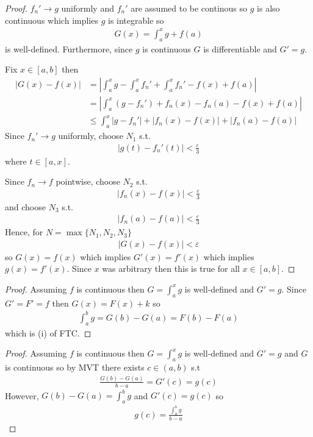 \begin{proof}
    $f_n'\rightarrow g$ uniformly and $f_n'$ are assumed to be 
    continous so $g$ is also continuous which implies $g$ is 
    integrable so 
    \begin{align*}
        G(x) = \int_a^x g + f(a)
    \end{align*}
    is well-defined.
    Furthermore, since $g$ is continuous $G$ is differentiable 
    and $G'=g$.

    Fix $x\in [a,b]$ then 
    \begin{align*}
        |G(x)-f(x)| &= |\int_a^x g - \int_a^x f_n' + \int_a^x f_n' - f(x) + f(a)| \\
        &= |\int_a^x (g - f_n') + f_n(x) - f_n(a) - f(x) + f(a)| \\
        &\leq \int_a^x |g - f_n'| + |f_n(x) - f(x)| + |f_n(a) - f(a)|
    \end{align*}
    Since $f_n'\rightarrow g$ uniformly, choose $N_1$ s.t. 
    \begin{align*}
        |g(t) - f_n'(t)| < \frac{\varepsilon}{3}
    \end{align*}
    where $t\in [a,x]$.

    Since $f_n\rightarrow f$ pointwise, choose $N_2$ s.t. 
    \begin{align*}
        |f_n(x) - f(x)| < \frac{\varepsilon}{3}
    \end{align*}
    and choose $N_3$ s.t. 
    \begin{align*}
        |f_n(a) - f(a)| < \frac{\varepsilon}{3}
    \end{align*}
    Hence, for $N=\max\{N_1, N_2, N_3\}$
    \begin{align*}
        |G(x)-f(x)| < \varepsilon
    \end{align*}
    so $G(x) = f(x)$ which implies $G'(x)=f'(x)$ which implies $g(x)=f'(x)$.
    Since $x$ was arbitrary then this is true for all $x\in [a,b]$.
\end{proof}

\begin{proof}
    Assuming $f$ is continuous then $G = \int_a^x g$ is well-defined and
     $G'=g$. Since $G'=F'=f$ then $G(x) = F(x) + k$ so 
    \begin{align*}
        \int_a^b g = G(b) - G(a) = F(b) - F(a)
    \end{align*}
    which is (i) of FTC. 
\end{proof}

\begin{proof}
    Assuming $f$ is continuous then $G = \int_a^x g$ is well-defined and
    $G'=g$ and $G$ is continuous so by MVT there exists $c\in(a,b)$ s.t 
    \begin{align*}
        \frac{G(b)-G(a)}{b-a} = G'(c) = g(c)
    \end{align*}
    However, $G(b)-G(a) = \int_a^b g$  and $ G'(c) = g(c)$ so
    \begin{align*}
        g(c) = \frac{\int_a^b g}{b-a}
    \end{align*} 
\end{proof}

